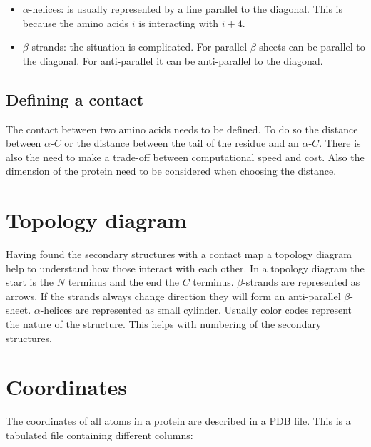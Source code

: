 \begin{multicols}{2}
	\begin{itemize}
		\item $\alpha$-helices: is usually represented by a line parallel to the diagonal.
			This is because the amino acids $i$ is interacting with $i+4$.
		\item $\beta$-strands: the situation is complicated.
			For parallel $\beta$ sheets can be parallel to the diagonal.
			For anti-parallel it can be anti-parallel to the diagonal.
	\end{itemize}
\end{multicols}

	\subsection{Defining a contact}
	The contact between two amino acids needs to be defined.
	To do so the distance between $\alpha$-$C$ or the distance between the tail of the residue and an $\alpha$-$C$.
	There is also the need to make a trade-off between computational speed and cost.
	Also the dimension of the protein need to be considered when choosing the distance.

\section{Topology diagram}
Having found the secondary structures with a contact map a topology diagram help to understand how those interact with each other.
In a topology diagram the start is the $N$ terminus and the end the $C$ terminus.
$\beta$-strands are represented as arrows.
If the strands always change direction they will form an anti-parallel $\beta$-sheet.
$\alpha$-helices are represented as small cylinder.
Usually color codes represent the nature of the structure.
This helps with numbering of the secondary structures.

\section{Coordinates}
The coordinates of all atoms in a protein are described in a PDB file.
This is a tabulated file containing different columns:

